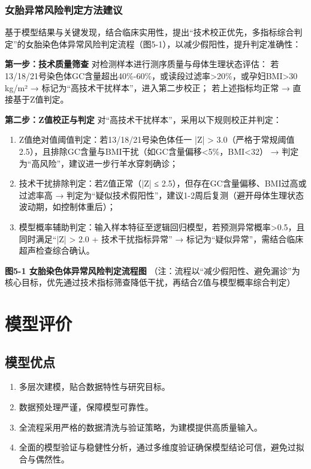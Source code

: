 \documentclass[withoutpreface,bwprint]{cumcmthesis} %
\begin{document}
\subsubsection{女胎异常风险判定方法建议}
基于模型结果与关键发现，结合临床实用性，提出“技术校正优先，多指标综合判定”的女胎染色体异常风险判定流程（图5-1），以减少假阳性，提升判定准确性：

\textbf{第一步：技术质量筛查}
对检测样本进行测序质量与母体生理状态评估：  
若13/18/21号染色体GC含量超出40\%-60\%，或读段过滤率>20\%，或孕妇BMI>30 kg/m² → 标记为“高技术干扰样本”，进入第二步校正；  
若上述指标均正常 → 直接基于Z值判定。

\textbf{第二步：Z值校正与判定}
对“高技术干扰样本”，采用以下规则校正并判定：
\begin{enumerate}
    \item Z值绝对值阈值判定：若13/18/21号染色体任一 |Z| > 3.0（严格于常规阈值2.5），且排除GC含量与BMI干扰（如GC含量偏移<5\%，BMI<32） → 判定为“高风险”，建议进一步行羊水穿刺确诊；
    \item 技术干扰排除判定：若Z值正常（|Z| ≤ 2.5），但存在GC含量偏移、BMI过高或过滤率高 → 判定为“疑似技术假阳性”，建议1-2周后复测（避开母体生理状态波动期，如控制体重后）；
    \item 模型概率辅助判定：输入样本特征至逻辑回归模型，若预测异常概率>0.5，且同时满足“|Z| > 2.0 + 技术干扰指标异常” → 标记为“疑似异常”，需结合临床超声检查综合确认。
\end{enumerate}

\textbf{图5-1 女胎染色体异常风险判定流程图}
（注：流程以“减少假阳性、避免漏诊”为核心目标，优先通过技术指标筛查降低干扰，再结合Z值与模型概率综合判定）


\section{模型评价}
\subsection{模型优点}

\begin{enumerate}
    \item 多层次建模，贴合数据特性与研究目标。
    \item 数据预处理严谨，保障模型可靠性。
    \item 全流程采用严格的数据清洗与验证策略，为建模提供高质量输入。
    \item 全面的模型验证与稳健性分析，通过多维度验证确保模型结论可信，避免过拟合与偶然性。
\end{enumerate}
\end{document}
